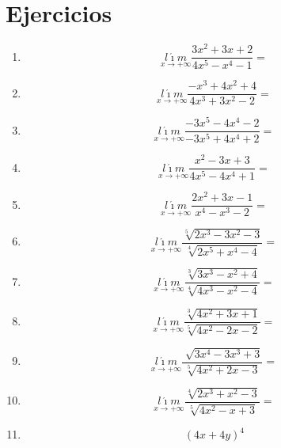 \documentclass[oneside,spanish,letter]{article}
\begin{document}
\section{Ejercicios}
\begin{enumerate}
 \item $$\underset{x\rightarrow +\infty}{l\acute{\imath}m} \frac{3x^2+3x+2}{4x^5-x^4-1}=$$
 \item $$\underset{x\rightarrow +\infty}{l\acute{\imath}m} \frac{-x^3+4x^2+4}{4x^3+3x^2-2}=$$
 \item $$\underset{x\rightarrow +\infty}{l\acute{\imath}m} \frac{-3x^5-4x^4-2}{-3x^5+4x^4+2}=$$
 \item $$\underset{x\rightarrow +\infty}{l\acute{\imath}m} \frac{x^2-3x+3}{4x^5-4x^4+1}=$$
 \item $$\underset{x\rightarrow +\infty}{l\acute{\imath}m} \frac{2x^2+3x-1}{x^4-x^3-2}=$$
 \item $$\underset{x\rightarrow +\infty}{l\acute{\imath}m} \frac{\sqrt[5]{2x^3-3x^2-3}}{\sqrt[4]{2x^5+x^4-4}}=$$
 \item $$\underset{x\rightarrow +\infty}{l\acute{\imath}m} \frac{\sqrt[3]{3x^3-x^2+4}}{\sqrt[4]{4x^3-x^2-4}}=$$
 \item $$\underset{x\rightarrow +\infty}{l\acute{\imath}m} \frac{\sqrt[3]{4x^2+3x+1}}{\sqrt[5]{4x^2-2x-2}}=$$
 \item $$\underset{x\rightarrow +\infty}{l\acute{\imath}m} \frac{\sqrt[]{3x^4-3x^3+3}}{\sqrt[5]{4x^2+2x-3}}=$$
 \item $$\underset{x\rightarrow +\infty}{l\acute{\imath}m} \frac{\sqrt[4]{2x^3+x^2-3}}{\sqrt[5]{4x^2-x+3}}=$$
\item $$(4x+4y)^4$$
 \end{enumerate}
  \newpage
\end{document}
